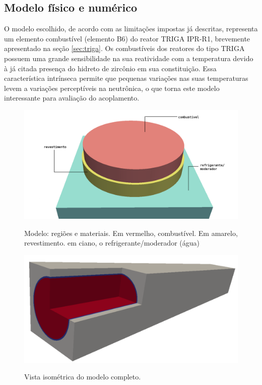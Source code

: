 


\subsection{Modelo físico e numérico}
\label{ssec:mod_fis_num}

O modelo escolhido, de acordo com as limitações impostas já descritas,
representa um elemento combustível (elemento B6) do reator TRIGA IPR-R1, brevemente
apresentado na seção \ref{sec:triga}. Os combustíveis dos reatores do tipo TRIGA
possuem uma grande sensibilidade na sua
reatividade com a temperatura devido à já citada presença do hidreto de zircônio
em sua constituição. Essa característica intrínseca permite que pequenas
variações nas suas temperaturas levem a variações perceptíveis na neutrônica,
o que torna este modelo interessante para avaliação do acoplamento.


\begin{figure}[htb]
  \caption{Modelo: regiões e materiais. Em vermelho, combustível. Em amarelo, revestimento.
  em ciano, o refrigerante/moderador (água)}
  \centering\includegraphics[scale=0.5]{figuras/regioes_surface2.png}
  \label{fig:regions}
\end{figure}

\begin{figure}[htb]
  \caption{Vista isométrica do modelo completo.}
  \centering\includegraphics[scale=0.6]{figuras/all_regions_isometric.png}
  \label{fig:region_isometric}
\end{figure}

